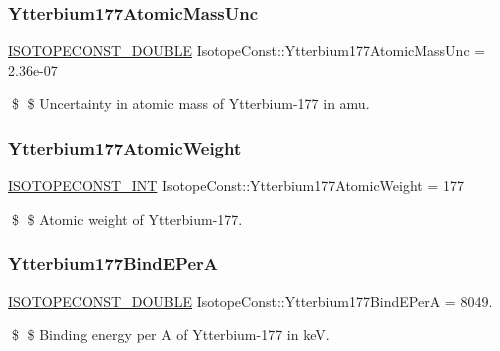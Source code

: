 \subsubsection{\texorpdfstring{Ytterbium177\+Atomic\+Mass\+Unc}{Ytterbium177AtomicMassUnc}}
{\footnotesize\ttfamily \mbox{\hyperlink{group___isotope_const-_macros_ga8f45a7272ce02c0b4c65c44636ed719a}{I\+S\+O\+T\+O\+P\+E\+C\+O\+N\+S\+T\+\_\+\+D\+O\+U\+B\+LE}} Isotope\+Const\+::\+Ytterbium177\+Atomic\+Mass\+Unc = 2.\+36e-\/07}

\$ \$ Uncertainty in atomic mass of Ytterbium-\/177 in amu. \mbox{\label{group___isotope_const-_ytterbium-_yb177_ga602a5d70836e07bf1a1db8275c55d66c}} 
\subsubsection{\texorpdfstring{Ytterbium177\+Atomic\+Weight}{Ytterbium177AtomicWeight}}
{\footnotesize\ttfamily \mbox{\hyperlink{group___isotope_const-_macros_ga5f18360b3e99483a35c32d789e62621c}{I\+S\+O\+T\+O\+P\+E\+C\+O\+N\+S\+T\+\_\+\+I\+NT}} Isotope\+Const\+::\+Ytterbium177\+Atomic\+Weight = 177}

\$ \$ Atomic weight of Ytterbium-\/177. \mbox{\label{group___isotope_const-_ytterbium-_yb177_ga7feff02d593adcedb3d29124133e0d70}} 
\subsubsection{\texorpdfstring{Ytterbium177\+Bind\+E\+PerA}{Ytterbium177BindEPerA}}
{\footnotesize\ttfamily \mbox{\hyperlink{group___isotope_const-_macros_ga8f45a7272ce02c0b4c65c44636ed719a}{I\+S\+O\+T\+O\+P\+E\+C\+O\+N\+S\+T\+\_\+\+D\+O\+U\+B\+LE}} Isotope\+Const\+::\+Ytterbium177\+Bind\+E\+PerA = 8049.}

\$ \$ Binding energy per A of Ytterbium-\/177 in keV. \mbox{\label{group___isotope_const-_ytterbium-_yb177_ga077e24e9f00b8b0eb51abd6c47e7fe4c}} 
